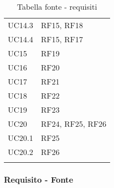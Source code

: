 {\begin{longtable}{C{.47\freewidth} C{.47\freewidth}}
      UC14.3 & RF15, RF18\\
      UC14.4 & RF15, RF17\\
      UC15 & RF19\\
      UC16 & RF20\\
      UC17 & RF21\\
      UC18 & RF22\\
      UC19 & RF23\\
      UC20 & RF24, RF25, RF26\\
      UC20.1 & RF25\\
      UC20.2 & RF26\\		
      \bottomrule
      \caption{Tabella fonte - requisiti}
      \end{longtable}
}
\newpage
\subsubsection{Requisito - Fonte}
